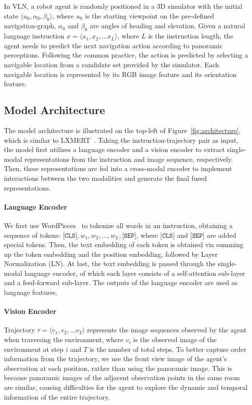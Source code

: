 \documentclass[10pt,twocolumn,letterpaper]{article}
\begin{document}
\vspace{-2pt}
In VLN, a robot agent is randomly positioned in a 3D simulator with the initial state 
$\langle {u}_{0},\alpha_{0},\beta_{0} \rangle$, where ${u}_{0}$ is the starting viewpoint on the pre-defined navigation-graph, $\alpha_{0}$ and $\beta_{0}$ are angles of heading and elevation.
Given a natural language instruction $x = \langle x_1, x_2, \dots x_L \rangle$, where $L$ is the instruction length,
the agent needs to predict the next navigation action according to panoramic perceptions. Following the common practice, the action is predicted by selecting a navigable location from a candidate set provided by the simulator. Each navigable location is represented by its RGB image feature and its orientation feature. 

\subsection{Model Architecture}
The model architecture is illustrated on the top-left of Figure~\ref{fig:architecture}, which is similar to LXMERT~\cite{lxmert}. 
Taking the instruction-trajectory pair as input, the model first utilizes a language encoder and a vision encoder to extract single-modal representations from the instruction and image sequence, respectively. 
Then, these representations are fed into a cross-modal encoder to implement interactions between the two modalities and generate the final fused representations. 

\vspace{-13pt}
\paragraph{Language Encoder} 
We first use WordPieces~\cite{Wordpieces} to tokenize all words in an instruction, obtaining a sequence of tokens: $ \texttt{[CLS]}, w_1, w_2,\dots,w_L, \texttt{[SEP]}$, where $\texttt{[CLS]}$ and $\texttt{[SEP]}$ are added special tokens. 
Then, the text embedding of each token is obtained via summing up the token embedding and the position embedding, followed by Layer Normalization (LN). At last, the text embedding is passed through the single-modal language encoder, of which each layer consists of a self-attention sub-layer and a feed-forward sub-layer. The outputs of the language encoder are used as language features.

\vspace{-8pt}
\paragraph{Vision Encoder}
Trajectory $\tau = \langle v_1, v_2, \dots v_T \rangle$ represents the image sequences observed by the agent when traversing the environment, where $v_i$ is the observed image of the environment at step $i$ and $T$ is the number of total steps. To better capture order information from the trajectory, we use the front view image of the agent's observation at each position, rather than using the panoramic image. 
This is because panoramic images of the adjacent observation points in the same room are similar, causing difficulties for the agent to explore the dynamic and temporal information of the entire trajectory.
\end{document}
